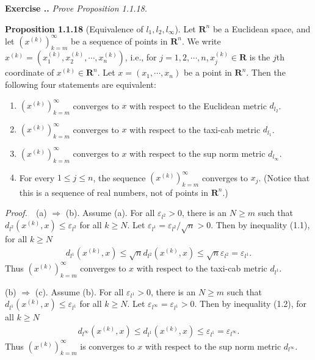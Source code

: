 \documentclass{book}
\newcommand{\pff}{\vspace{.25em}\noindent\emph{Proof.}~~}
\newcommand{\titl}[1]{\noindent\textbf{#1}}
\newcounter{Exercise}[section]
\renewcommand{\theExercise}{\thesection.\arabic{Exercise}.}
\newcommand{\new}{\vspace{1.5em}\noindent\textbf{Exercise \stepcounter{Exercise}\textbf{\theExercise}} }
\begin{document}
\new\emph{Prove Proposition 1.1.18.}

\begin{framed}
\titl{Proposition 1.1.18} (Equivalence of $l_1,l_2,l_{\infty}$). Let $\mathbf{R}^n$ be a Euclidean space, and let $(x^{(k)})_{k=m}^{\infty}$ be a sequence of points in $\mathbf{R}^n$. We write $x^{(k)}=(x^{(k)}_1,x^{(k)}_2,\cdots,x^{(k)}_n)$, i.e., for $j=1,2,\cdots,n,x^{(k)}_j\in\mathbf{R}$ is the $j$th coordinate of $x^{(k)}\in\mathbf{R}^n$. Let $x=(x_1,\cdots,x_n)$ be a point in $\mathbf{R}^n$. Then the following four statements are equivalent:
\begin{enumerate}
    \item $(x^{(k)})_{k=m}^{\infty}$ converges to $x$ with respect to the Euclidean metric $d_{l_2}$.
    \item $(x^{(k)})_{k=m}^{\infty}$ converges to $x$ with respect to the taxi-cab metric $d_{l_1}$.
    \item $(x^{(k)})_{k=m}^{\infty}$ converges to $x$ with respect to the sup norm metric $d_{l_{\infty}}$.
    \item For every $1\leq j\leq n$, the sequence $(x^{(k)})_{k=m}^{\infty}$ converges to $x_j$. (Notice that this is a sequence of real numbers, not of points in $\mathbf{R}^n$.)
\end{enumerate}
\end{framed}

\pff (a) $\Rightarrow$ (b). Assume (a). For all $\varepsilon_{l^2}>0$, there is an $N\geq m$ such that $d_{l^2}(x^{(k)},x)\leq\varepsilon_{l^2}$ for all $k\geq N$. Let $\varepsilon_{l^1}=\varepsilon_{l^2}/\sqrt{n}>0$. Then by inequality (1.1), for all $k\geq N$
    \begin{align*}
        d_{l^1}(x^{(k)},x)\leq\sqrt{n}d_{l^2}(x^{(k)},x)\leq\sqrt{n}\varepsilon_{l^2}=\varepsilon_{l^1}.
    \end{align*}
Thus $(x^{(k)})_{k=m}^{\infty}$ converges to $x$ with respect to the taxi-cab metric $d_{l^1}$.

(b) $\Rightarrow$ (c). Assume (b). For all $\varepsilon_{l^1}>0$, there is an $N\geq m$ such that $d_{l^1}(x^{(k)},x)\leq\varepsilon_{l^1}$ for all $k\geq N$. Let $\varepsilon_{l^\infty}=\varepsilon_{l^1}>0$. Then by inequality (1.2), for all $k\geq N$
    \begin{align*}
        d_{l^\infty}(x^{(k)},x)\leq d_{l^1}(x^{(k)},x)\leq\varepsilon_{l^1}=\varepsilon_{l^\infty}.
    \end{align*}
Thus $(x^{(k)})_{k=m}^{\infty}$ is converges to $x$ with respect to the sup norm metric $d_{l^\infty}$.
\end{document}
